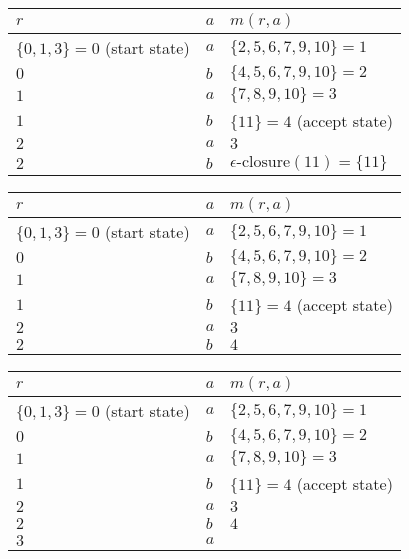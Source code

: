 \documentclass[8pt,a4paper,compress]{beamer}
\begin{document}
\begin{frame}[fragile]
\begin{overprint}
\begin{center}
\begin{tabular}{|C{4cm}|C{.5cm}|C{4cm}|} \hline
$r$ & $a$ & $m(r, a)$ \\ \hline \hline
$\{0, 1, 3\} = 0$ (start state) & $a$ &  $\{2, 5, 6, 7, 9, 10\} = 1$ \\ \hline
$0$ & $b$ & $\{4, 5, 6, 7, 9, 10\} = 2$  \\ \hline
$1$ & $a$ & $\{7, 8, 9, 10\} = 3$  \\ \hline
$1$ & $b$ & $\{11\} = 4$ (accept state) \\ \hline
$2$ & $a$ & $3$ \\ \hline
$2$ & $b$ &  $\epsilon\text{-closure}(11) = \{11\}$ \\ \hline
\end{tabular}
\end{center}

\begin{center}
\begin{tabular}{|C{4cm}|C{.5cm}|C{4cm}|} \hline
$r$ & $a$ & $m(r, a)$ \\ \hline \hline
$\{0, 1, 3\} = 0$ (start state) & $a$ &  $\{2, 5, 6, 7, 9, 10\} = 1$ \\ \hline
$0$ & $b$ & $\{4, 5, 6, 7, 9, 10\} = 2$  \\ \hline
$1$ & $a$ & $\{7, 8, 9, 10\} = 3$  \\ \hline
$1$ & $b$ & $\{11\} = 4$ (accept state) \\ \hline
$2$ & $a$ & $3$ \\ \hline
$2$ & $b$ & $4$ \\ \hline
\end{tabular}
\end{center}

\begin{center}
\begin{tabular}{|C{4cm}|C{.5cm}|C{4cm}|} \hline
$r$ & $a$ & $m(r, a)$ \\ \hline \hline
$\{0, 1, 3\} = 0$ (start state) & $a$ &  $\{2, 5, 6, 7, 9, 10\} = 1$ \\ \hline
$0$ & $b$ & $\{4, 5, 6, 7, 9, 10\} = 2$  \\ \hline
$1$ & $a$ & $\{7, 8, 9, 10\} = 3$  \\ \hline
$1$ & $b$ & $\{11\} = 4$ (accept state) \\ \hline
$2$ & $a$ & $3$ \\ \hline
$2$ & $b$ & $4$ \\ \hline
$3$ & $a$ &  \\ \hline
\end{tabular}
\end{center}


\end{overprint}
\end{frame}
\end{document}
